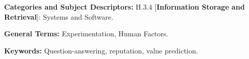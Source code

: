 \documentclass[conference]{IEEEtran}
\begin{document}
\hfill \break
\noindent\textbf{Categories and Subject Descriptors:} H.3.4 [\textbf{Information Storage and Retrieval}]: Systems and Software.


\noindent\textbf{General Terms:} Experimentation, Human Factors.


\noindent\textbf{Keywords:} Question-answering, reputation, value prediction.






















\vspace{12pt}
\end{document}
